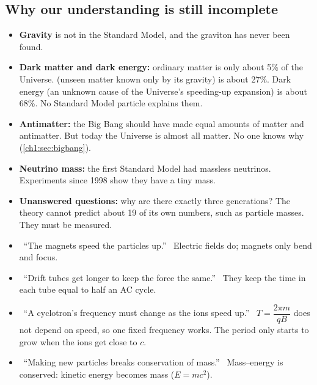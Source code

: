 \subsection{Why our understanding is still incomplete}

\begin{itemize}
  \item \textbf{Gravity} is not in the Standard Model, and the graviton has never been found.
  \item \textbf{Dark matter and dark energy:} ordinary matter is only about 5\% of the
        Universe.  (unseen matter known only by its gravity) is about
        27\%. Dark energy (an unknown cause of the Universe's speeding-up expansion) is
        about 68\%. No Standard Model particle explains them.
  \item \textbf{Antimatter:} the Big Bang should have made equal amounts of matter and
        antimatter. But today the Universe is almost all matter. No one knows why
        (\cref{ch1:sec:bigbang}).
  \item \textbf{Neutrino mass:} the first Standard Model had massless neutrinos.
        Experiments since 1998 show they have a tiny mass.
  \item \textbf{Unanswered questions:} why are there exactly three generations? The theory
        cannot predict about 19 of its own numbers, such as particle masses. They must be
        measured.
\end{itemize}

\begin{mistakes}
\begin{itemize}
  \item \xmark\ ``The magnets speed the particles up.'' \cmark\ Electric fields do; magnets
        only bend and focus.
  \item \xmark\ ``Drift tubes get longer to keep the force the same.'' \cmark\ They keep
        the time in each tube equal to half an AC cycle.
  \item \xmark\ ``A cyclotron's frequency must change as the ions speed up.''
        \cmark\ $T = \dfrac{2\pi m}{qB}$ does not depend on speed, so one fixed frequency
        works. The period only starts to grow when the ions get close to $c$.
  \item \xmark\ ``Making new particles breaks conservation of mass.'' \cmark\ Mass--energy
        is conserved: kinetic energy becomes mass ($E = mc^2$).
\end{itemize}
\end{mistakes}


